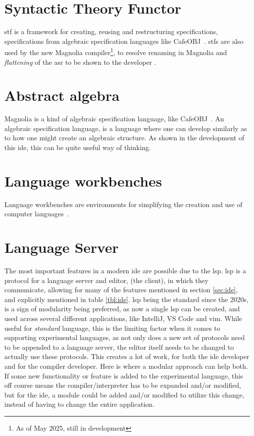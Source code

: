 \section{Syntactic Theory Functor}

\gls*{stf} is a framework for creating, reusing and restructuring
specifications\cite{stf:haveraaen:2020}, specifications from algebraic
specification languages like CafeOBJ~\cite{cafeObj}. \gls*{stf}s are also used
by the new Magnolia compiler\footnote{As of May 2025, still in development}, to
resolve renaming in Magnolia and \textit{flattening} of the \gls*{asr} to be
shown to the developer \cite{wiig}.


\section{Abstract algebra}

Magnolia is a kind of algebraic specification language, like CafeOBJ~\cite{cafeObj}.
An algebraic specification language, is a language where one can develop
similarly as to how one might create an algebraic structure. As shown in the
development of this \gls*{ide}, this can be quite useful way of thinking.


\section{Language workbenches}

Language workbenches are environments for simplifying the creation and use of
computer languages~\cite{lwb}.


\section{Language Server}

The most important features in a modern \gls*{ide} are possible due to the
\gls*{lsp}. \gls*{lsp} is a protocol for a language server and editor,
(the client), in which they communicate, allowing for many of the features
mentioned in section \ref{sec:ide}, and explicitly mentioned in table
\ref{tbl:ide}. \gls*{lsp} being the standard since the 2020s, is a sign of
modularity being preferred, as now a single \gls*{lsp} can be created, and used
across several different applications, like IntelliJ, VS Code and \gls*{vim}.
While useful for \textit{standard} language, this is the limiting factor when it
comes to supporting experimental languages, as not only does a new set of
protocols need to be appended to a language server, the editor itself needs to
be changed to actually use these protocols. This creates a lot of work, for both
the \gls*{ide} developer and for the compiler developer. Here is where a modular
approach can help both. If some new functionality or feature is added to the
experimental language, this off course means the compiler/interpreter has to be
expanded and/or modified, but for the \gls*{ide}, a module could be added and/or
modified to utilize this change, instead of having to change the entire
application.

